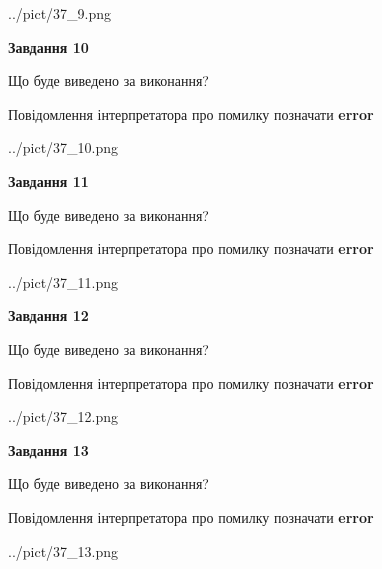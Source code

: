 \documentclass[11pt, ukrainian]{article}
\begin{document}
{\begin {large}
\begin{center}
	{../pict/37_9.png}
\end{center}
\newpage

{\begin {center}\textbf{Завдання 10}\end {center}}\par
Що буде виведено за виконання? \par
Повідомлення інтерпретатора про помилку позначати \textbf{error}

\begin{center}
	{../pict/37_10.png}
\end{center}
\newpage

{\begin {center}\textbf{Завдання 11}\end {center}}\par
Що буде виведено за виконання? \par
Повідомлення інтерпретатора про помилку позначати \textbf{error}

\begin{center}
	{../pict/37_11.png}
\end{center}
\newpage

{\begin {center}\textbf{Завдання 12}\end {center}}\par
Що буде виведено за виконання? \par
Повідомлення інтерпретатора про помилку позначати \textbf{error}

\begin{center}
	{../pict/37_12.png}
\end{center}
\newpage

{\begin {center}\textbf{Завдання 13}\end {center}}\par
Що буде виведено за виконання? \par
Повідомлення інтерпретатора про помилку позначати \textbf{error}

\begin{center}
	{../pict/37_13.png}
\end{center}
\newpage


\end{large}}
\end{document}
